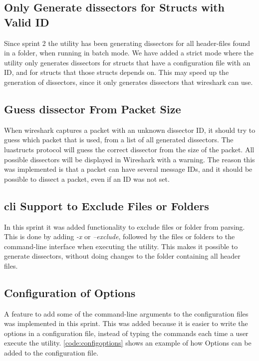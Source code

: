 \subsection{Only Generate \glspl{dissector} for Structs with Valid ID}
Since sprint 2 the \gls{utility} has been generating \glspl{dissector} for all \gls{header}-files 
found in a folder, when running in \gls{batch mode}. We have added a strict mode where the \gls{utility} 
only generates \glspl{dissector} for \glspl{struct} that have a configuration file with an 
ID, and for \glspl{struct} that those structs depends on. This may speed up the 
generation of \glspl{dissector}, since it only generates \glspl{dissector} that \Gls{wireshark} 
can use.

\subsection{Guess \Gls{dissector} From Packet Size}
When \Gls{wireshark} captures a packet with an unknown dissector ID, it should try to 
guess which packet that is used, from a list of all generated dissectors. The 
luastructs protocol will guess the correct dissector from the size of the 
packet. All possible dissectors will be displayed in Wireshark with a warning. 
The reason this was implemented is that a packet can have several message IDs, 
and it should be possible to dissect a packet, even if an ID was not set.

\subsection{\gls{cli} Support to Exclude Files or Folders}
In this sprint it was added functionality to exclude files or folder from 
parsing. This is done by adding \emph{-x} or \emph{--exclude}, followed by the 
files or folders to the command-line interface when executing the utility. 
This makes it possible to generate dissectors, without doing changes to the 
folder containing all header files.

\subsection{Configuration of Options}
A feature to add some of the command-line arguments to the configuration files 
was implemented in this sprint. This was added because it is easier to write 
the options in a configuration file, instead of typing the commands each time 
a user execute the utility. \autoref{code:configoptions} shows an example of 
how Options can be added to the configuration file.

